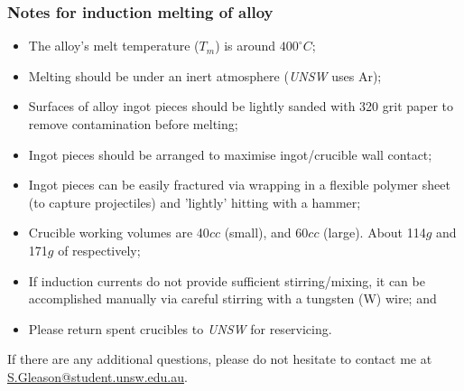 \subsubsection{Notes for induction melting of \MgZnCa alloy}
\begin{itemize}
\item The \MgZnCa alloy's melt temperature ($T_{m}$) is around $400^{\circ}C$;
\item Melting should be under an inert atmosphere (\textit{UNSW} uses Ar);
\item Surfaces of alloy ingot pieces should be lightly sanded with 320 grit paper to remove contamination before melting;
\item Ingot pieces should be arranged to maximise ingot/crucible wall contact;
\item Ingot pieces can be easily fractured via wrapping in a flexible polymer sheet (to capture projectiles) and 'lightly' hitting with a hammer;
\item Crucible working volumes are 40$cc$ (small), and 60$cc$ (large). About 114$g$ and 171$g$ of \MgZnCa respectively;
\item If induction currents do not provide sufficient stirring/mixing, it can be accomplished manually via careful stirring with a tungsten (W) wire; and
\item Please return spent crucibles to \textit{UNSW} for reservicing. 
\end{itemize}

If there are any additional questions, please do not hesitate to contact me at \href{"mailto:s.gleason@student.unsw.edu.au"}{S.Gleason@student.unsw.edu.au}. 